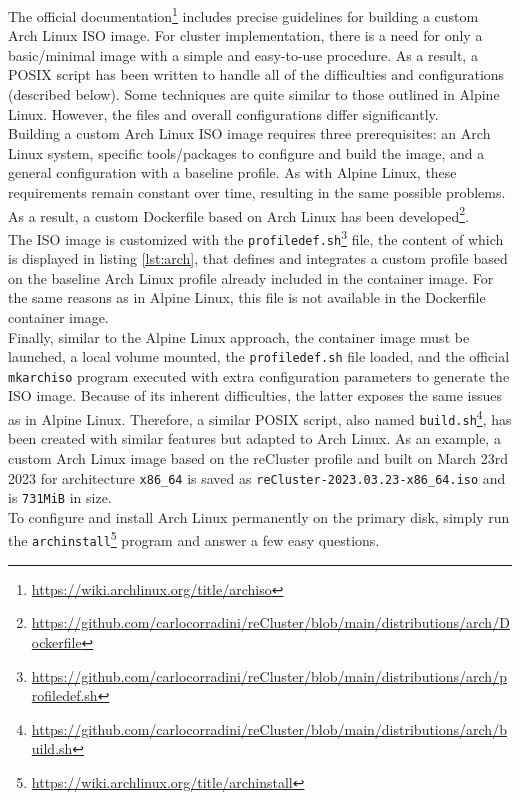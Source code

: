 The official documentation\footnote{\url{https://wiki.archlinux.org/title/archiso}}
includes precise guidelines for building a custom Arch Linux ISO image. For
cluster implementation, there is a need for only a basic/minimal image with a simple
and easy-to-use procedure. As a result, a POSIX script has been written to handle
all of the difficulties and configurations (described below). Some techniques
are quite similar to those outlined in Alpine Linux. However, the files and
overall configurations differ significantly. \\ %
Building a custom Arch Linux ISO image requires three prerequisites: an Arch Linux
system, specific tools/packages to configure and build the image, and a general configuration
with a baseline profile. As with Alpine Linux, these requirements remain constant
over time, resulting in the same possible problems. As a result, a custom
Dockerfile based on Arch Linux has been developed\footnote{\url{https://github.com/carlocorradini/reCluster/blob/main/distributions/arch/Dockerfile}}.
\\ %
The ISO image is customized with the \texttt{profiledef.sh}\footnote{\url{https://github.com/carlocorradini/reCluster/blob/main/distributions/arch/profiledef.sh}}
file, the content of which is displayed in listing \ref{lst:arch}, that defines and
integrates a custom profile based on the baseline Arch Linux profile already included
in the container image. For the same reasons as in Alpine Linux, this file is not
available in the Dockerfile container image. \\ %
Finally, similar to the Alpine Linux approach, the container image must be launched,
a local volume mounted, the \texttt{profiledef.sh} file loaded, and the official
\texttt{mkarchiso} program executed with extra configuration parameters to
generate the ISO image. Because of its inherent difficulties, the latter exposes
the same issues as in Alpine Linux. Therefore, a similar POSIX script, also named
\texttt{build.sh}\footnote{\url{https://github.com/carlocorradini/reCluster/blob/main/distributions/arch/build.sh}},
has been created with similar features but adapted to Arch Linux. As an example,
a custom Arch Linux image based on the reCluster profile and built on March 23rd
2023 for architecture \texttt{x86\_64} is saved as \texttt{reCluster-2023.03.23-x86\_64.iso}
and is \texttt{731MiB} in size. \\ %
To configure and install Arch Linux permanently on the primary disk, simply run the
\texttt{archinstall}\footnote{\url{https://wiki.archlinux.org/title/archinstall}}
program and answer a few easy questions.

